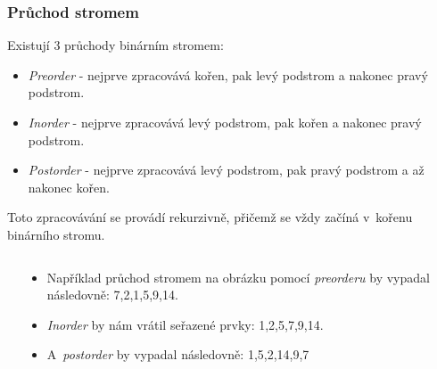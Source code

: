 \documentclass[10pt]{beamer}
\begin{document}
\begin{frame}\frametitle{Průchod stromem}

    Existují 3 průchody binárním stromem:
    \begin{itemize}
        \item \emph{Preorder} - nejprve zpracovává kořen, pak levý podstrom a nakonec pravý podstrom.
        \item \emph{Inorder} - nejprve zpracovává levý podstrom, pak kořen a nakonec pravý podstrom.
        \item \emph{Postorder} - nejprve zpracovává levý podstrom, pak pravý podstrom a až nakonec kořen.
    \end{itemize}

    Toto zpracovávání se provádí rekurzivně, přičemž se vždy začíná v~kořenu binárního stromu.
    \begin{columns}
        \begin{column}{0.35\textwidth}
            \label{imgPreorder}
        \end{column}
        \begin{column}{0.65\textwidth}
            \begin{itemize}
            \item Například průchod stromem na obrázku pomocí \emph{preorderu} by vypadal následovně: 7,2,1,5,9,14.
            
            \item \emph{Inorder} by nám vrátil seřazené prvky: 1,2,5,7,9,14.
            
            \item A~\emph{postorder} by vypadal následovně: 1,5,2,14,9,7
            \end{itemize}
        \end{column}
    \end{columns}
    
\end{frame}
\end{document}
